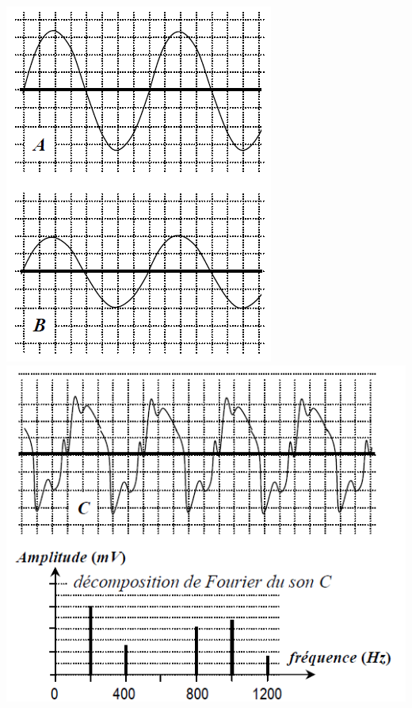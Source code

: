 \begin{minipage}[c]{.46\linewidth}
\begin{center}
\includegraphics[width=\columnwidth]{images/Exo5_Ondes_Sons}
\includegraphics[width=\columnwidth]{images/Exo5_Ondes_Sons_2}
\end{center}
\end{minipage}